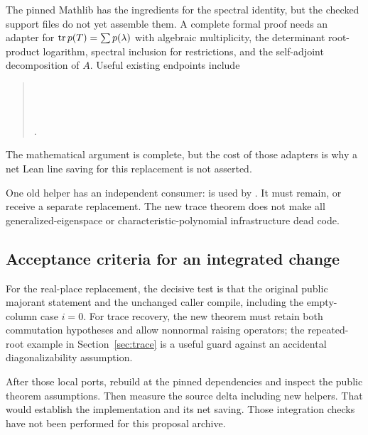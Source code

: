 The pinned Mathlib has the ingredients for the spectral identity, but the checked
support files do not yet assemble them. A complete formal proof needs an adapter
for \(\operatorname{tr} p(T)=\sum p(\lambda)\) with algebraic multiplicity, the determinant
root-product logarithm, spectral inclusion for restrictions, and the self-adjoint
decomposition of \(A\). Useful existing endpoints include
\begin{quote}\small
{}\\
\\
\\
.
\end{quote}
The mathematical argument is complete, but the cost of those adapters is why a
net Lean line saving for this replacement is not asserted.

One old helper has an independent consumer:
 is used by
.
It must remain, or receive a separate replacement. The new trace theorem does not
make all generalized-eigenspace or characteristic-polynomial infrastructure dead code.

\subsection{Acceptance criteria for an integrated change}

For the real-place replacement, the decisive test is that the original public
majorant statement and the unchanged  caller compile, including
the empty-column case \(i=0\). For trace recovery, the new theorem must retain both
commutation hypotheses and allow nonnormal raising operators; the repeated-root
example in Section~\ref{sec:trace} is a useful guard against an accidental
diagonalizability assumption.

After those local ports, rebuild  at the pinned dependencies and inspect
the public theorem assumptions. Then measure the source delta including new helpers.
That would establish the implementation and its net saving. Those integration checks
have not been performed for this proposal archive.
